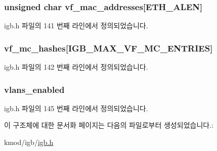 \subsubsection[{\texorpdfstring{vf\+\_\+mac\+\_\+addresses}{vf_mac_addresses}}]{\setlength{\rightskip}{0pt plus 5cm}unsigned char vf\+\_\+mac\+\_\+addresses\mbox{[}{\bf E\+T\+H\+\_\+\+A\+L\+EN}\mbox{]}}\hypertarget{structvf__data__storage_af8b31ab04432231145129c4cf97564d7}{}\label{structvf__data__storage_af8b31ab04432231145129c4cf97564d7}


igb.\+h 파일의 141 번째 라인에서 정의되었습니다.

\subsubsection[{\texorpdfstring{vf\+\_\+mc\+\_\+hashes}{vf_mc_hashes}}]{ vf\+\_\+mc\+\_\+hashes\mbox{[}{\bf I\+G\+B\+\_\+\+M\+A\+X\+\_\+\+V\+F\+\_\+\+M\+C\+\_\+\+E\+N\+T\+R\+I\+ES}\mbox{]}}\hypertarget{structvf__data__storage_af90ca0822ec7563ef8e81a5ae4c0dea9}{}\label{structvf__data__storage_af90ca0822ec7563ef8e81a5ae4c0dea9}


igb.\+h 파일의 142 번째 라인에서 정의되었습니다.

\subsubsection[{\texorpdfstring{vlans\+\_\+enabled}{vlans_enabled}}]{ vlans\+\_\+enabled}\hypertarget{structvf__data__storage_aaacbf33baac1c57aa21691925b0223c2}{}\label{structvf__data__storage_aaacbf33baac1c57aa21691925b0223c2}


igb.\+h 파일의 145 번째 라인에서 정의되었습니다.



이 구조체에 대한 문서화 페이지는 다음의 파일로부터 생성되었습니다.\+:\begin{DoxyCompactItemize}
\item 
kmod/igb/\hyperlink{kmod_2igb_2igb_8h}{igb.\+h}\end{DoxyCompactItemize}
